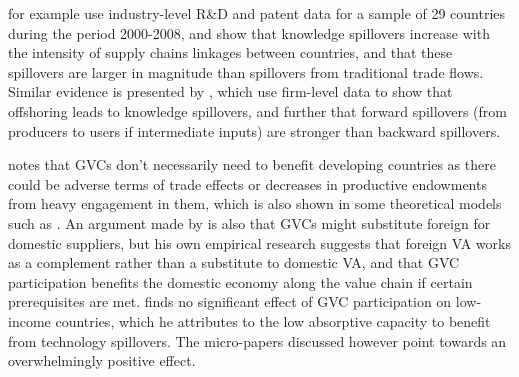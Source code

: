 \documentclass[a4paper]{article}
\begin{document}
\citet{piermartini2014knowledge} for example use industry-level R\&D and patent data for a sample of 29 countries during the period 2000-2008, and show that knowledge spillovers increase with the intensity of supply chains linkages between countries, and that these spillovers are larger in magnitude than spillovers from traditional trade flows. Similar evidence is presented by \citet{benz2015trade}, which use firm-level data to show that offshoring leads to knowledge spillovers, and further that forward spillovers (from producers to users if intermediate inputs) are stronger than backward spillovers. \newline

\citet{Kummritz20161} notes that GVCs don't necessarily need to benefit developing countries as there could be adverse terms of trade effects or decreases in productive endowments from heavy engagement in them, which is also shown in some theoretical models such as \citet{baldwin2014trade}. An argument made by \citet{kummritz2015global} is also that GVCs might substitute foreign for domestic suppliers, but his own empirical research suggests that 
foreign VA works as a complement rather than a substitute to domestic VA, and that GVC participation benefits the domestic economy along the value chain if certain prerequisites are met.  \citet{kummritz2015global} finds no significant effect of GVC participation on low-income countries, which he attributes to the low absorptive capacity to benefit from technology spillovers. The micro-papers discussed however point towards an overwhelmingly positive effect. \newline




\end{document}
